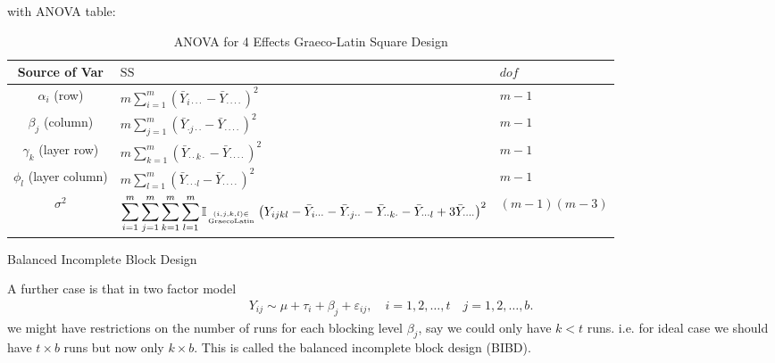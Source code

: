 with ANOVA table:
\begin{table}[H]
    \centering
    \renewcommand\arraystretch{1.15}
    \begin{tabular}{cll}
        \hline
        Source of Var&$ \mathrm{SS} $&$ dof $\\
        \hline
        $ \alpha _i $ (row)&$\displaystyle  m\sum_{i=1}^m \left(\bar{Y}_{i\cdot \cdot \cdot }-\bar{Y}_{\cdot \cdot \cdot \cdot  }\right)^2  $&$ m-1 $\\
        $ \beta _j $ (column)&$\displaystyle  m\sum_{j=1}^m \left(\bar{Y}_{\cdot j\cdot \cdot }-\bar{Y}_{\cdot \cdot \cdot \cdot }\right)^2 $ &$ m-1 $\\
        $ \gamma _k $ (layer row)&$ \displaystyle m\sum_{k=1}^m \left(\bar{Y}_{\cdot \cdot k\cdot }-\bar{Y}_{\cdot \cdot \cdot \cdot }\right)^2 $&$ m-1 $\\
        $ \phi _l $ (layer column)&$\displaystyle  m\sum_{l=1}^m \left(\bar{Y}_{\cdot \cdot \cdot l}-\bar{Y}_{\cdot \cdot \cdot \cdot }\right)^2 $&$ m-1 $\\
        $ \sigma ^2$&$ \displaystyle \sum_{i=1}^m\sum_{j=1}^m\sum_{k=1}^{m}\sum_{l=1}^{m}\mathbb{I}_{(i,j,k,l)\in\atop \mathrm{GraecoLatin}}\left(Y_{ijkl}-\bar{Y}_{i\cdot \cdot \cdot  }-\bar{Y}_{\cdot j\cdot \cdot }-\bar{Y}_{\cdot \cdot k\cdot }-\bar{Y}_{\cdot \cdot \cdot l}+3\bar{Y}_{\cdot \cdot \cdot \cdot } \right)^2 $&$ (m-1)(m-3) $\\
        \hline
    \end{tabular}
    \caption{ANOVA for 4 Effects Graeco-Latin Square Design}
    \label{tab:ANOVAfor4EffectsGraecoLatinSquareDesign}
\end{table}





\begin{point}
    Balanced Incomplete Block Design
\end{point}

A further case is that in two factor model 
\begin{align*}
    Y_{ij}\sim \mu +\tau _i+\beta _j +\varepsilon _{ij},\quad i=1,2,\ldots,t\quad j=1,2,\ldots,b. 
\end{align*}
we might have restrictions on the number of runs for each blocking level $ \beta_j  $, say we could only have $ k<t $ runs. i.e. for ideal case we should have $ t\times b $ runs but now only $ k\times b $. This is called the balanced incomplete block design (BIBD).

